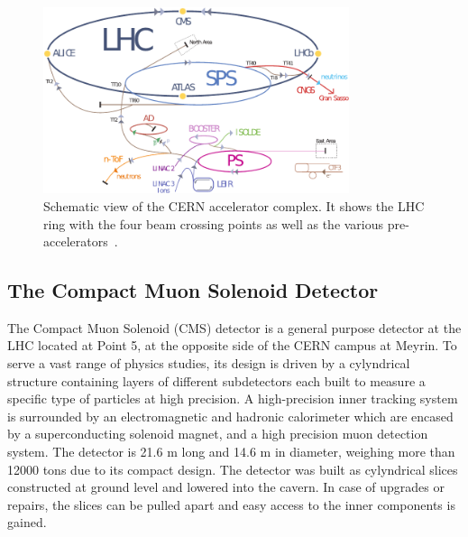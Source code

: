 \begin{figure}[htp]
    \centering
    \includegraphics[width=0.8\textwidth]{figures/cms_detector/lhc_accelerator_chain.pdf}
    \caption[CERN accelerator complex]{Schematic view of the CERN
        accelerator complex. It shows the LHC ring  with the four beam crossing
        points as well as the various pre-accelerators~\cite{LHC:COMPLEX}.}
    \label{fig:lhc_complex}
\end{figure}

\subsection{The Compact Muon Solenoid Detector}

The Compact Muon Solenoid (CMS) detector is a general purpose detector at the
LHC located at Point 5, at the opposite side of the CERN campus at Meyrin. To
serve a vast range of physics studies, its design is driven by a cylyndrical
structure containing layers of different subdetectors each built
to measure a specific type of particles at high precision. A high-precision
inner tracking system is surrounded by an electromagnetic and hadronic
calorimeter which are encased by a superconducting solenoid magnet, and a high
precision muon detection system. The detector is 21.6 m long and 14.6 m in
diameter, weighing more than 12000 tons due to its compact design. The detector
was built as cylyndrical slices constructed at ground level and lowered into the
cavern. In case of upgrades or repairs, the slices can be pulled apart and easy
access to the inner components is gained. 

